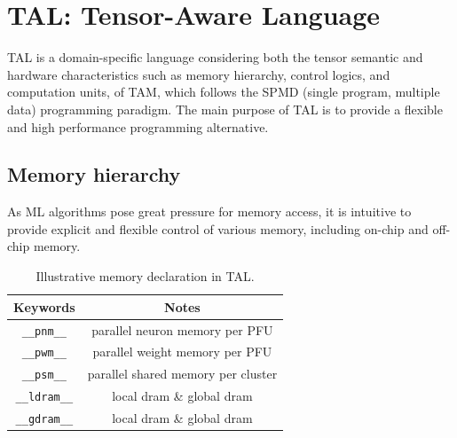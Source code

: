 
\section{TAL: Tensor-Aware Language}

TAL is a domain-specific language considering both the tensor semantic and hardware characteristics such as memory hierarchy, control logics, and computation units, of TAM, which follows the SPMD (single program, multiple data) programming paradigm. The main purpose of TAL is to provide a flexible and high performance programming alternative.

\subsection{Memory hierarchy}
As ML algorithms pose great pressure for memory access, it is intuitive to provide explicit and flexible control of various memory, including on-chip and off-chip memory.

\begin{table}[b]
  \centering
  \scriptsize
  \vspace{-15pt}
\caption{\footnotesize Illustrative memory declaration in TAL.}
  \label{tab:mem-mlce}
  \begin{tabular}{cc}
    \toprule
Keywords & Notes\\
    \midrule
\texttt{\_\_pnm\_\_} & parallel neuron memory per PFU\\
    \midrule
\texttt{\_\_pwm\_\_} & parallel weight memory per PFU\\
    \midrule
\texttt{\_\_psm\_\_} & parallel shared memory per cluster\\
    \midrule
\texttt{\_\_ldram\_\_} & local dram \& global dram\\
    \midrule
\texttt{\_\_gdram\_\_} & local dram \& global dram\\
    \bottomrule
  \end{tabular}
\end{table}

